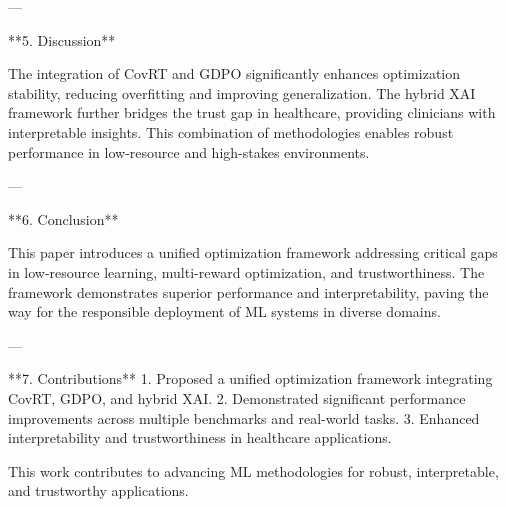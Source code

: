---

**5. Discussion**  

The integration of CovRT and GDPO significantly enhances optimization stability, reducing overfitting and improving generalization. The hybrid XAI framework further bridges the trust gap in healthcare, providing clinicians with interpretable insights. This combination of methodologies enables robust performance in low-resource and high-stakes environments.  

---

**6. Conclusion**  

This paper introduces a unified optimization framework addressing critical gaps in low-resource learning, multi-reward optimization, and trustworthiness. The framework demonstrates superior performance and interpretability, paving the way for the responsible deployment of ML systems in diverse domains.  

---

**7. Contributions**  
1. Proposed a unified optimization framework integrating CovRT, GDPO, and hybrid XAI.  
2. Demonstrated significant performance improvements across multiple benchmarks and real-world tasks.  
3. Enhanced interpretability and trustworthiness in healthcare applications.  

This work contributes to advancing ML methodologies for robust, interpretable, and trustworthy applications.